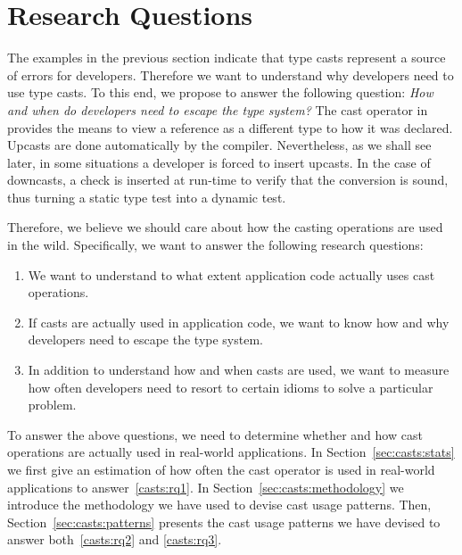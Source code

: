 \section{Research Questions}

The examples in the previous section indicate that type casts represent a source of errors for developers.
Therefore we want to understand why developers need to use type casts.
To this end, we propose to answer the following question:
\emph{How and when do developers need to escape the type system?}
%
%
The cast operator in \java{} provides the means to view a reference as a different type to how it was declared.
%
%
Upcasts are done automatically by the compiler.
Nevertheless, as we shall see later, in some situations a developer is forced to insert upcasts.
In the case of downcasts,
a check is inserted at run-time to verify that the conversion is sound,
%
%
thus turning a static type test into a dynamic test.

Therefore, we believe we should care about how the casting operations are used in the wild.
Specifically, we want to answer the following research questions:

\begin{enumerate}[label=$RQ/C\arabic*:$,ref=$RQ/C\arabic*$,leftmargin=3.4\parindent]
\item\label{enum:rq1}{\bf \crqA}
We want to understand to what extent application code actually uses cast operations.
\item\label{enum:rq2}{\bf \crqB}
If casts are actually used in application code, we want to know how and why developers need to escape the type system.
\item\label{enum:rq3}{\bf \crqC}
In addition to understand how and when casts are used, we want to measure how often developers need to resort to certain idioms to solve a particular problem.
\end{enumerate}

To answer the above questions, we need to determine whether and how cast operations are actually used in real-world \java{} applications.
In Section~\ref{sec:casts:stats} we first give an estimation of how often the cast operator is used in real-world applications to answer~\ref{casts:rq1}.
In Section~\ref{sec:casts:methodology} we introduce the methodology we have used to devise cast usage patterns.
Then, Section~\ref{sec:casts:patterns} presents the cast usage patterns we have devised to answer both~\ref{casts:rq2} and \ref{casts:rq3}.
